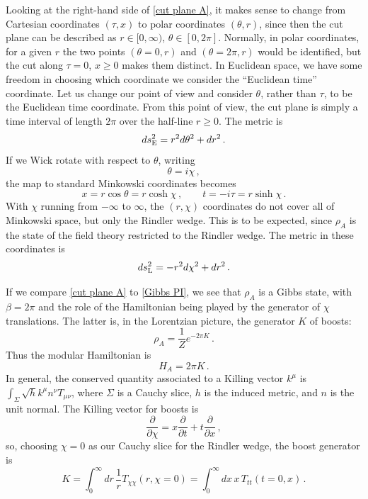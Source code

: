 \documentclass[11pt]{article}
\newcommand{\pd}[2]{\frac{\partial #1}{\partial #2}}
\begin{document}
Looking at the right-hand side of \eqref{cut plane A}, it makes sense to change from Cartesian coordinates $(\tau,x)$ to polar coordinates $(\theta,r)$, since then the cut plane can be described as $r\in[0,\infty)$, $\theta\in[0,2\pi]$. Normally, in polar coordinates, for a given $r$ the two points $(\theta=0,r)$ and $(\theta=2\pi,r)$ would be identified, but the cut along $\tau=0$, $x\ge0$ makes them distinct. In Euclidean space, we have some freedom in choosing which coordinate we consider the ``Euclidean time'' coordinate. Let us change our point of view and consider $\theta$, rather than $\tau$, to be the Euclidean time coordinate. From this point of view, the cut plane is simply a time interval of length $2\pi$ over the half-line $r\ge0$. The metric is
\begin{equation}
ds^2_{\rm E} = r^2d\theta^2+dr^2\,.
\end{equation}
If we Wick rotate with respect to $\theta$, writing
\begin{equation}
\theta = i\chi\,,
\end{equation}
the map to standard Minkowski coordinates becomes
\begin{equation}
x = r\cos\theta=r\cosh\chi\,,\qquad
t = -i\tau = r\sinh\chi\,.
\end{equation}
With $\chi$ running from $-\infty$ to $\infty$, the $(r,\chi)$ coordinates do not cover all of Minkowski space, but only the Rindler wedge. This is to be expected, since $\rho_A$ is the state of the field theory restricted to the Rindler wedge. The metric in these coordinates is
\begin{equation}\label{Rindler metric}
ds^2_{\rm L} = -r^2d\chi^2+dr^2\,.
\end{equation}

If we compare \eqref{cut plane A} to \eqref{Gibbs PI}, we see that $\rho_A$ is a Gibbs state, with $\beta=2\pi$ and the role of the Hamiltonian being played by the generator of $\chi$ translations. The latter is, in the Lorentzian picture, the generator $K$ of boosts:
\begin{equation}\label{A thermal}
\rho_A =\frac1Z e^{-2\pi K}\,.
\end{equation}
Thus the modular Hamiltonian is
\begin{equation}
H_A = 2\pi K\,.
\end{equation}
In general, the conserved quantity associated to a Killing vector $k^\mu$ is $\int_\Sigma\sqrt{h}k^\mu n^\nu T_{\mu\nu}$, where $\Sigma$ is a Cauchy slice, $h$ is the induced metric, and $n$ is the unit normal. The Killing vector for boosts is
\begin{equation}
\pd{}{\chi} = x\pd{}{t}+t\pd{}{x}\,,
\end{equation}
so, choosing $\chi=0$ as our Cauchy slice for the Rindler wedge, the boost generator is
\begin{equation}\label{boost}
K = \int_0^\infty dr\,\frac1rT_{\chi\chi}(r,\chi=0) = \int_0^\infty dx \,x\,T_{tt}(t=0,x)\,.
\end{equation}
\end{document}
